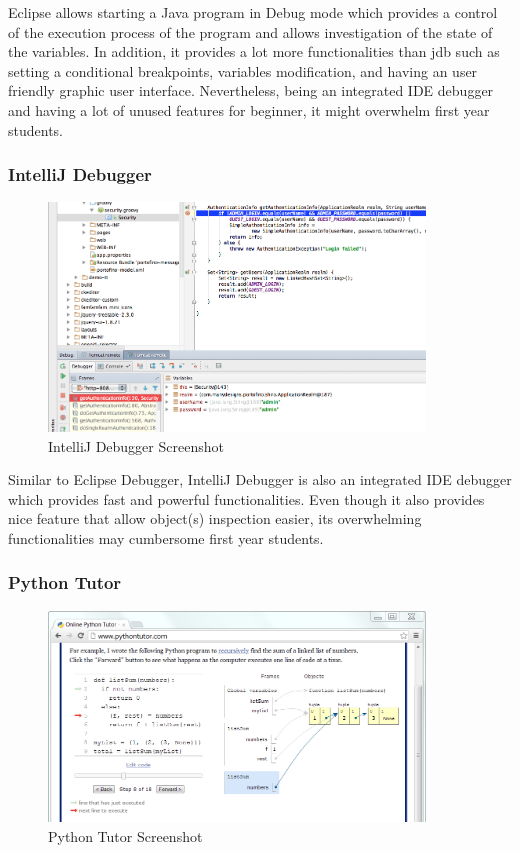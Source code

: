 \documentclass[11pt, a4paper]{article}
\begin{document}
Eclipse allows starting a Java program in Debug mode which provides a control of the execution process of the program and allows investigation of the state of the variables.
In addition, it provides a lot more functionalities than jdb such as setting a conditional breakpoints, variables modification, and having an user friendly graphic user interface.
Nevertheless, being an integrated IDE debugger and having a lot of unused features for beginner, it might overwhelm first year students.
\subsubsection{IntelliJ Debugger}
\begin{figure}[h!]
\centering
\includegraphics[width=100mm]{intellij.png}
\caption{IntelliJ Debugger Screenshot}
\end{figure}

Similar to Eclipse Debugger, IntelliJ Debugger is also an integrated IDE debugger which provides fast and powerful functionalities.
Even though it also provides nice feature that allow object(s) inspection easier, its overwhelming functionalities may cumbersome first year students.
\subsubsection{Python Tutor}
\begin{figure}[h!]
\centering
\includegraphics[width=100mm]{pythontutor.png}
\caption{Python Tutor Screenshot}
\end{figure}
\end{document}
